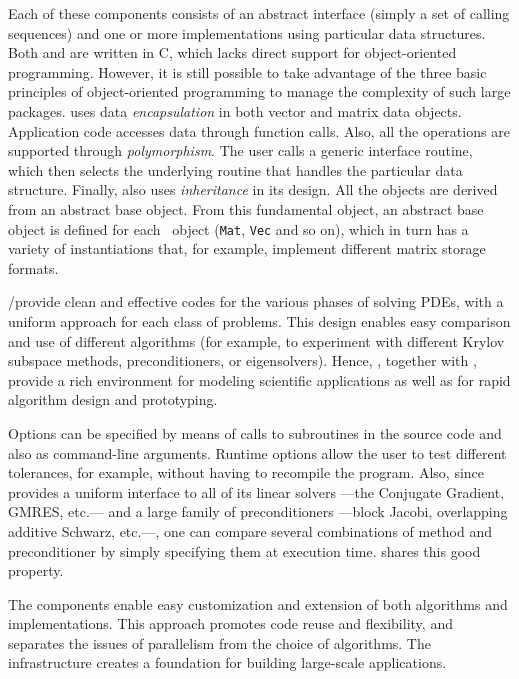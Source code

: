 	Each of these components consists of an abstract interface (simply a set of calling sequences) and one or more implementations using particular data structures. Both \petsc and \slepc are written in C, which lacks direct support for object-oriented programming. However, it is still possible to take advantage of the three basic principles of object-oriented programming to manage the complexity of such large packages. \petsc uses data \emph{encapsulation} in both vector and matrix data objects. Application code accesses data through function calls. Also, all the operations are supported through \emph{polymorphism}. The user calls a generic interface routine, which then selects the underlying routine that handles the particular data structure. Finally, \petsc also uses \emph{inheritance} in its design. All the objects are derived from an abstract base object. From this fundamental object, an abstract base object is defined for each \petsc\ object (\texttt{Mat}, \texttt{Vec} and so on), which in turn has a variety of instantiations that, for example, implement different matrix storage formats.

	\petsc/\slepc provide clean and effective codes for the various phases of solving PDEs, with a uniform approach for each class of problems.  This design enables easy comparison and use of different algorithms (for example, to experiment with different Krylov subspace methods, preconditioners, or eigensolvers). Hence, \petsc, together with \slepc, provide a rich environment for modeling scientific applications as well as for rapid algorithm design and prototyping.

	Options can be specified by means of calls to subroutines in the source code and also as command-line arguments. Runtime options allow the user to test different tolerances, for example, without having to recompile the program. Also, since \petsc provides a uniform interface to all of its linear solvers ---the Conjugate Gradient, GMRES, etc.--- and a large family of preconditioners ---block Jacobi, overlapping additive Schwarz, etc.---, one can compare several combinations of method and preconditioner by simply specifying them at execution time. \slepc shares this good property.
	
	The components enable easy customization and extension of both algorithms and implementations. This approach promotes code reuse and flexibility, and separates the issues of parallelism from the choice of algorithms.  The \petsc infrastructure creates a foundation for building large-scale applications.

